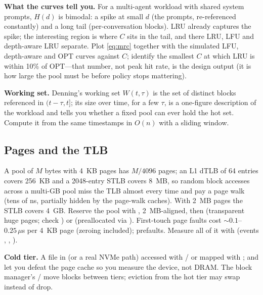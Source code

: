 \textbf{What the curves tell you.} For a multi-agent workload with shared system prompts, $H(d)$ is bimodal: a spike at small $d$ (the prompts, re-referenced constantly) and a long tail (per-conversation blocks). LRU already captures the spike; the interesting region is where $C$ sits in the tail, and there LRU, LFU and depth-aware LRU separate. Plot \eqref{eq:mrc} together with the simulated LFU, depth-aware and OPT curves against $C$; identify the smallest $C$ at which LRU is within 10\% of OPT---that number, not peak hit rate, is the design output (it is how large the pool must be before policy stops mattering).

\textbf{Working set.} Denning's working set $W(t,\tau)$ is the set of distinct blocks referenced in $(t-\tau, t]$; its size over time, for a few $\tau$, is a one-figure description of the workload and tells you whether a fixed pool can ever hold the hot set. Compute it from the same timestamps in $O(n)$ with a sliding window.

\subsection{Pages and the TLB}

A pool of $M$ bytes with 4~KB pages has $M/4096$ pages; an L1 dTLB of 64 entries covers 256~KB and a 2048-entry STLB covers 8~MB, so random block accesses across a multi-GB pool miss the TLB almost every time and pay a page walk (tens of ns, partially hidden by the page-walk caches). With 2~MB pages the STLB covers 4~GB. Reserve the pool with , 2~MB-aligned, then  (transparent huge pages; check ) or  (preallocated via ). First-touch page faults cost $\sim 0.1$--$0.25\,\mu$s per 4~KB page (zeroing included);  prefaults. Measure all of it with  (events , , ).

\textbf{Cold tier.} A file in  (or a real NVMe path) accessed with / or mapped with ;  and  let you defeat the page cache so you measure the device, not DRAM. The block manager's / move blocks between tiers; eviction from the hot tier may swap instead of drop.

